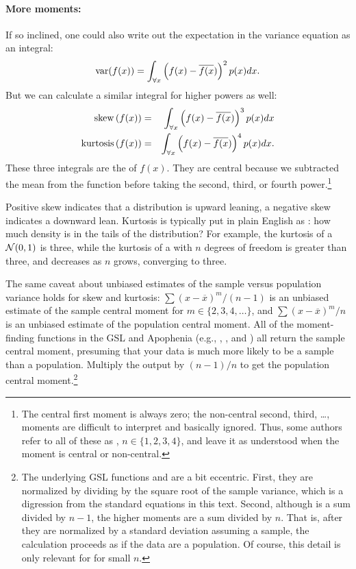 \paragraph{More moments:}   
If so inclined, one could also write out the
expectation in the variance equation as an integral:
$$\operatorname{var}(f(x))=\int_{\forall x} \left(f(x) - \overline{f(x})\right)^2 p(x) dx.$$
But we can calculate a similar integral for higher powers as well:
\begin{eqnarray*}
{\rm skew}\left(f(x)\right)&=&\int_{\forall x} \left(f(x) - \overline{f(x})\right)^3 p(x) dx\\
{\rm kurtosis}\left(f(x)\right)&=&\int_{\forall x} \left(f(x) - \overline{f(x})\right)^4 p(x) dx.
\end{eqnarray*}
These three integrals are the  of $f(x)$. They
are central because we subtracted the mean from the function before
taking the second, third, or fourth power.\footnote{The
central first moment is always zero; the non-central second, third,
\dots, moments are difficult to interpret and basically ignored. Thus,
some authors refer to all of these as , $n \in
\{1, 2, 3, 4\}$, and leave
it as understood when the moment is central or non-central.}

Positive skew indicates that a distribution is upward leaning, a negative
skew indicates a downward lean. Kurtosis is typically put in plain
English as : how much density is in the tails of the
distribution? For example, the kurtosis of a ${\cal N}(0,1)$ is three,
while the kurtosis of a  with $n$ degrees of
freedom is greater than three, and decreases as $n$ grows, converging to
three. 

 
 
\label{kurtskew}
The same caveat about unbiased estimates of the sample versus population
variance holds for skew and kurtosis: $\sum (x-\overline x)^m/(n-1)$
is an unbiased estimate of the sample central moment for $m \in\{2, 3,
4, \dots\}$, and $\sum (x-\overline x)^m/n$ is an unbiased estimate of
the population central moment. All of the moment-finding functions in
the GSL and Apophenia (e.g.,
,
, and
) all return the sample central
moment, presuming that your data is much more likely to be a sample than
a population. Multiply the output by $(n-1)/n$ to get the population
central moment.\footnote{The underlying GSL functions 
 and  are a bit
eccentric.   
First, they are 
normalized by dividing by the square root of the sample variance, which
is a digression from the standard equations in this text. Second, although
 is a sum divided by $n-1$, the higher moments
are a sum divided by $n$. That is, after they are normalized by a standard
deviation assuming a sample, the calculation proceeds as if the data are a
population. Of course, this detail is only relevant for for small $n$.}


